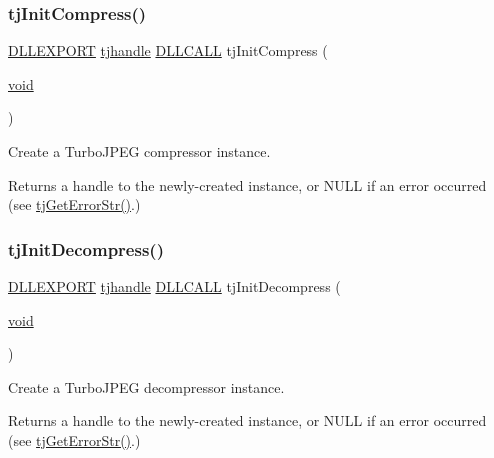 \subsubsection{\texorpdfstring{tj\+Init\+Compress()}{tjInitCompress()}}
{\footnotesize\ttfamily \hyperlink{turbojpeg_8h_a808e08638be3cba36e36759e5b150de0}{D\+L\+L\+E\+X\+P\+O\+RT} \hyperlink{group___turbo_j_p_e_g_ga758d2634ecb4949de7815cba621f5763}{tjhandle} \hyperlink{turbojpeg_8h_a54b25836118bfac94a53a7b790f3ccb2}{D\+L\+L\+C\+A\+LL} tj\+Init\+Compress (\begin{DoxyParamCaption}\item[{\hyperlink{png_8h_ac9c84fa68bbad002983e35ce3663c686}{void}}]{ }\end{DoxyParamCaption})}

Create a Turbo\+J\+P\+EG compressor instance.

\begin{DoxyReturn}{Returns}
a handle to the newly-\/created instance, or N\+U\+LL if an error occurred (see \hyperlink{group___turbo_j_p_e_g_ga9af79c908ec131b1ae8d52fe40375abf}{tj\+Get\+Error\+Str()}.) 
\end{DoxyReturn}
\mbox{\label{group___turbo_j_p_e_g_gae5408179d041e2a2f7199c8283cf649e}} 
\subsubsection{\texorpdfstring{tj\+Init\+Decompress()}{tjInitDecompress()}}
{\footnotesize\ttfamily \hyperlink{turbojpeg_8h_a808e08638be3cba36e36759e5b150de0}{D\+L\+L\+E\+X\+P\+O\+RT} \hyperlink{group___turbo_j_p_e_g_ga758d2634ecb4949de7815cba621f5763}{tjhandle} \hyperlink{turbojpeg_8h_a54b25836118bfac94a53a7b790f3ccb2}{D\+L\+L\+C\+A\+LL} tj\+Init\+Decompress (\begin{DoxyParamCaption}\item[{\hyperlink{png_8h_ac9c84fa68bbad002983e35ce3663c686}{void}}]{ }\end{DoxyParamCaption})}

Create a Turbo\+J\+P\+EG decompressor instance.

\begin{DoxyReturn}{Returns}
a handle to the newly-\/created instance, or N\+U\+LL if an error occurred (see \hyperlink{group___turbo_j_p_e_g_ga9af79c908ec131b1ae8d52fe40375abf}{tj\+Get\+Error\+Str()}.) 
\end{DoxyReturn}
\mbox{\label{group___turbo_j_p_e_g_ga3155b775bfbac9dbba869b95a0367902}} 

